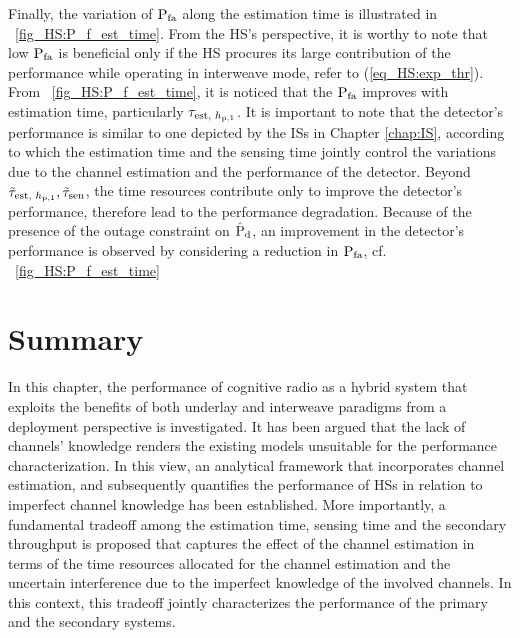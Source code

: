 Finally, the variation of $\text{P}_{\text{fa}}$ along the estimation time is illustrated in \figurename~\ref{fig_HS:P_f_est_time}. From the HS's perspective, it is worthy to note that low $\text{P}_{\text{fa}}$ is beneficial only if the HS procures its large contribution of the performance while operating in interweave mode, refer to (\ref{eq_HS:exp_thr}). From \figurename~\ref{fig_HS:P_f_est_time}, it is noticed that the $\text{P}_{\text{fa}}$ improves with estimation time, particularly $\tau_{\text{est, $h_{\text{p,1}}$}}$. It is important to note that the detector's performance is similar to one depicted by the ISs in Chapter \ref{chap:IS}, according to which the estimation time and the sensing time jointly control the variations due to the channel estimation and the performance of the detector. Beyond $\tilde{\tau}_{\text{est, $h_{\text{p,1}}$}}, \tilde{\tau}_{\text{sen}}$, the time resources contribute only to improve the detector's performance, therefore lead to the performance degradation. Because of the presence of the outage constraint on $\hat{\text{P}}_{\text{d}}$, an improvement in the detector's performance is observed by considering a reduction in $\text{P}_{\text{fa}}$, cf. \figurename~\ref{fig_HS:P_f_est_time} 

\section{Summary} \label{sec_HS:conc}
In this chapter, the performance of cognitive radio as a hybrid system that exploits the benefits of both underlay and interweave paradigms from a deployment perspective is investigated. It has been argued that the lack of channels' knowledge renders the existing models unsuitable for the performance characterization. In this view, an analytical framework that incorporates channel estimation, and subsequently quantifies the performance of HSs in relation to imperfect channel knowledge has been established. More importantly, a fundamental tradeoff among the estimation time, sensing time and the secondary throughput is proposed that captures the effect of the channel estimation in terms of the time resources allocated for the channel estimation and the uncertain interference due to the imperfect knowledge of the involved channels. In this context, this tradeoff jointly characterizes the performance of the primary and the secondary systems. %

